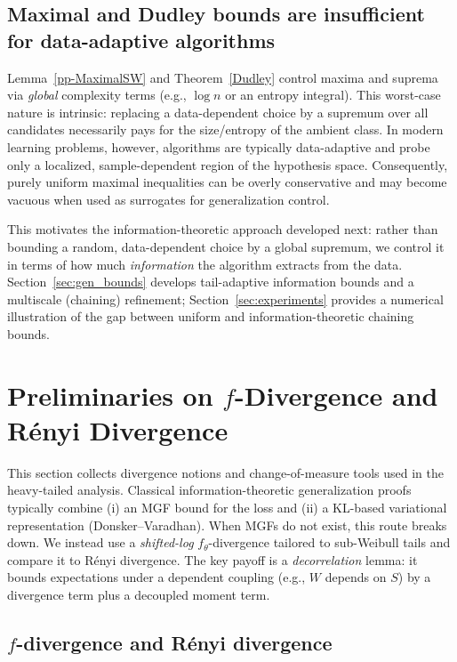 \documentclass[11pt]{article}
\providecommand{\Renyi}{R\'enyi }
\begin{document}
\subsection{Maximal and Dudley bounds are insufficient for data-adaptive algorithms}

Lemma~\ref{pp-MaximalSW} and Theorem~\ref{Dudley} control maxima and suprema via
\emph{global} complexity terms (e.g., $\log n$ or an entropy integral).  This
worst-case nature is intrinsic: replacing a data-dependent choice by a supremum
over all candidates necessarily pays for the size/entropy of the ambient class.
In modern learning problems, however, algorithms are typically data-adaptive and
probe only a localized, sample-dependent region of the hypothesis space.
Consequently, purely uniform maximal inequalities can be overly conservative and
may become vacuous when used as surrogates for generalization control.

This motivates the information-theoretic approach developed next: rather than
bounding a random, data-dependent choice by a global supremum, we control it in
terms of how much \emph{information} the algorithm extracts from the data.
Section~\ref{sec:gen_bounds} develops tail-adaptive information bounds and a
multiscale (chaining) refinement; Section~\ref{sec:experiments} provides a
numerical illustration of the gap between uniform and information-theoretic
chaining bounds.

\section{Preliminaries on \texorpdfstring{$f$}{f}-Divergence and \Renyi Divergence}\label{sec:pre}

This section collects divergence notions and change-of-measure tools used in the
heavy-tailed analysis.  Classical information-theoretic generalization proofs
typically combine (i) an MGF bound for the loss and (ii) a KL-based variational
representation (Donsker--Varadhan).  When MGFs do not exist, this route breaks
down.  We instead use a \emph{shifted-log} $f_\theta$-divergence tailored to
sub-Weibull tails and compare it to R\'enyi divergence.  The key payoff is a
\emph{decorrelation} lemma: it bounds expectations under a dependent coupling
(e.g., $W$ depends on $S$) by a divergence term plus a decoupled moment term.

\subsection{\texorpdfstring{$f$}{f}-divergence and \Renyi divergence}
\end{document}
